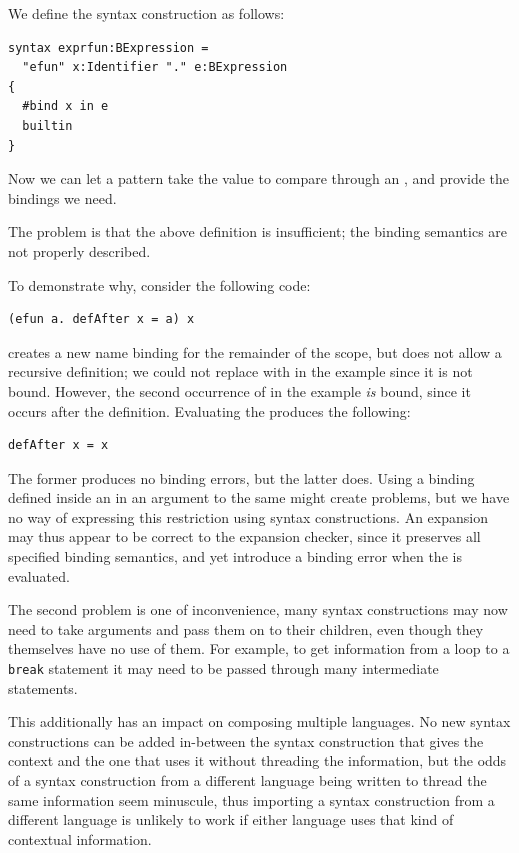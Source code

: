 \documentclass{kththesis}
\begin{document}
We define the syntax construction as follows:

\begin{verbatim}
syntax exprfun:BExpression =
  "efun" x:Identifier "." e:BExpression
{
  #bind x in e
  builtin
}
\end{verbatim}

Now we can let a pattern take the value to compare through an , and provide the bindings we need.

The problem is that the above definition is insufficient; the binding semantics are not properly described.

To demonstrate why, consider the following code:

\begin{verbatim}
(efun a. defAfter x = a) x
\end{verbatim}

 creates a new name binding for the remainder of the scope, but does not allow a recursive definition; we could not replace  with  in the example since it is not bound. However, the second occurrence of  in the example \emph{is} bound, since it occurs after the definition. Evaluating the  produces the following:

\begin{verbatim}
defAfter x = x
\end{verbatim}

The former produces no binding errors, but the latter does. Using a binding defined inside an  in an argument to the same  might create problems, but we have no way of expressing this restriction using syntax constructions. An expansion may thus appear to be correct to the expansion checker, since it preserves all specified binding semantics, and yet introduce a binding error when the  is evaluated.

The second problem is one of inconvenience, many syntax constructions may now need to take arguments and pass them on to their children, even though they themselves have no use of them. For example, to get information from a loop to a \texttt{break} statement it may need to be passed through many intermediate statements.

This additionally has an impact on composing multiple languages. No new syntax constructions can be added in-between the syntax construction that gives the context and the one that uses it without threading the information, but the odds of a syntax construction from a different language being written to thread the same information seem minuscule, thus importing a syntax construction from a different language is unlikely to work if either language uses that kind of contextual information.
\end{document}
